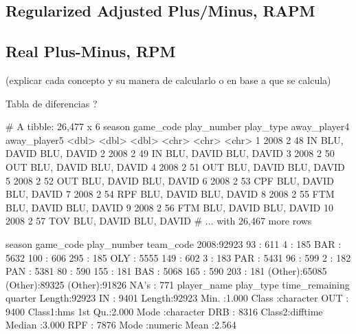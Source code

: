 \documentclass[paper=a4, fontsize=9pt]{article}
\begin{document}
\subsection{Regularized Adjusted Plus/Minus, RAPM}

\subsection{Real Plus-Minus, RPM}

(explicar cada concepto y su manera de calcularlo o en base a que se calcula)

Tabla de diferencias ?

\clearpage

\begin{Schunk}
\begin{Soutput}
# A tibble: 26,477 x 6
   season game_code play_number play_type away_player4 away_player5
    <dbl>     <dbl>       <dbl> <chr>     <chr>        <chr>       
 1   2008         2          48 IN        BLU, DAVID   BLU, DAVID  
 2   2008         2          49 IN        BLU, DAVID   BLU, DAVID  
 3   2008         2          50 OUT       BLU, DAVID   BLU, DAVID  
 4   2008         2          51 OUT       BLU, DAVID   BLU, DAVID  
 5   2008         2          52 OUT       BLU, DAVID   BLU, DAVID  
 6   2008         2          53 CPF       BLU, DAVID   BLU, DAVID  
 7   2008         2          54 RPF       BLU, DAVID   BLU, DAVID  
 8   2008         2          55 FTM       BLU, DAVID   BLU, DAVID  
 9   2008         2          56 FTM       BLU, DAVID   BLU, DAVID  
10   2008         2          57 TOV       BLU, DAVID   BLU, DAVID  
# ... with 26,467 more rows
\end{Soutput}
\begin{Soutput}
  season        game_code      play_number      team_code    
 2008:92923   93     :  611   4      :  185   BAR    : 5632  
              100    :  606   295    :  185   OLY    : 5555  
              149    :  602   3      :  183   PAR    : 5431  
              96     :  599   2      :  182   PAN    : 5381  
              80     :  590   155    :  181   BAS    : 5068  
              165    :  590   203    :  181   (Other):65085  
              (Other):89325   (Other):91826   NA's   :  771  
 player_name          play_type     time_remaining       quarter     
 Length:92923       IN     : 9401   Length:92923      Min.   :1.000  
 Class :character   OUT    : 9400   Class1:hms        1st Qu.:2.000  
 Mode  :character   DRB    : 8316   Class2:difftime   Median :3.000  
                    RPF    : 7876   Mode  :numeric    Mean   :2.564  

\end{Soutput}
\end{Schunk}
\end{document}
